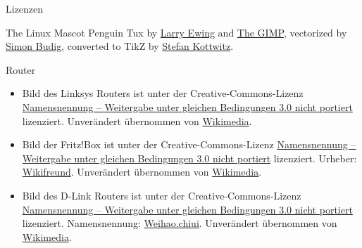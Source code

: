 \documentclass[t]{beamer}
\begin{document}
\begin{frame}{Lizenzen}
    \begin{block}{The Linux Mascot}
        Penguin Tux by \href{mailto:lewing@isc.tamu.edu}{Larry Ewing}
        and \href{http://isc.tamu.edu/~lewing/linux/}{The GIMP},
        vectorized by \href{http://www.home.unix-ag.org/simon/}{Simon Budig},
        converted to TikZ by
        \href{http://www.texample.net/weblog/2012/apr/28/tux-tex-tikz/}{Stefan Kottwitz}.
    \end{block}
    \begin{block}{Router}
        \small
        \begin{itemize}
            \item Bild des Linksys Routers ist unter der
                Creative-Commons-Lizenz
                \href{https://creativecommons.org/licenses/by-sa/3.0/deed.de}{Namensnennung
                – Weitergabe unter gleichen Bedingungen 3.0 nicht portiert}
                lizenziert. Unverändert übernommen von
                \href{https://commons.wikimedia.org/wiki/File:Linksys_BEFSR41_Router_20040321.jpg}{Wikimedia}.
            \item Bild der Fritz!Box ist unter der Creative-Commons-Lizenz
                \href{https://creativecommons.org/licenses/by-sa/3.0/deed.de}{Namensnennung
                – Weitergabe unter gleichen Bedingungen 3.0 nicht portiert}
                lizenziert. Urheber:
                \href{https://commons.wikimedia.org/wiki/User:Wikifreund}{Wikifreund}.
                Unverändert übernommen von
                \href{https://commons.wikimedia.org/wiki/File:FRITZ!Box_6490_Cable.JPG}{Wikimedia}.
            \item Bild des D-Link Routers ist unter der Creative-Commons-Lizenz
                \href{https://creativecommons.org/licenses/by-sa/3.0/deed.de}{Namensnennung
                – Weitergabe unter gleichen Bedingungen 3.0 nicht portiert}
                lizenziert. Namensnennung:
                \href{https://zh.wikipedia.org/wiki/User:Weihao.chiu}{Weihao.chiui}.
                Unverändert übernommen von
                \href{https://commons.wikimedia.org/wiki/File:D-Link_DI-524.jpg}{Wikimedia}.
        \end{itemize}
        \normalsize
    \end{block}
\end{frame}
\end{document}
